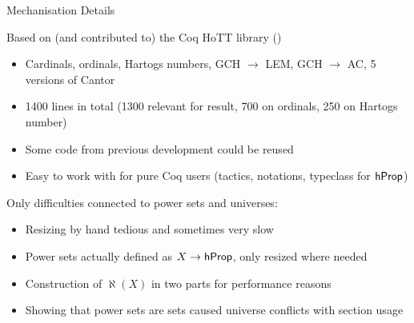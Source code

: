\documentclass[xcolor=dvipsnames,compress,aspectratio=169]{beamer}
\begin{document}
\begin{frame}{Mechanisation Details}

	\pause
	\vspace{0.25cm}
			Based on (and contributed to) the Coq HoTT library (\cite{bauer2017hott})
			\begin{itemize}
				\vspace{0.15cm}
				\item
				Cardinals, ordinals, Hartogs numbers, GCH $\to$ LEM, GCH $\to$ AC, 5 versions of Cantor
				\vspace{0.15cm}
				\item
				1400 lines in total (1300 relevant for result, 700 on ordinals, 250 on Hartogs number)
				\vspace{0.15cm}
				\item
				Some code from previous development could be reused
				\vspace{0.15cm}
				\item
				Easy to work with for pure Coq users (tactics, notations, typeclass for $\mathsf{hProp}$)
			\end{itemize}

	\pause
	\vspace{0.5cm}
	Only difficulties connected to power sets and universes:
	\begin{itemize}
		\vspace{0.15cm}
		\item
		Resizing by hand tedious and sometimes very slow
		\vspace{0.15cm}
		\item
		Power sets actually defined as $X\to\mathsf{hProp}$, only resized where needed
		\vspace{0.15cm}
		\item
		Construction of $\aleph(X)$ in two parts for performance reasons
		\vspace{0.15cm}
		\item
		Showing that power sets are sets caused universe conflicts with section usage
	\end{itemize}
\end{frame}
\end{document}
